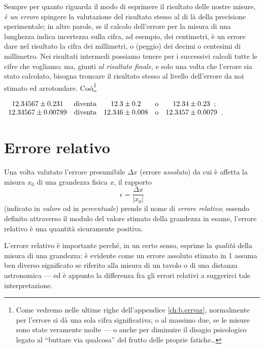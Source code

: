 Sempre per quanto riguarda il modo di esprimere il risultato
delle nostre misure, \emph{\`e un errore} spingere la
valutazione del risultato stesso al di l\`a della precisione
sperimentale; in altre parole, se il calcolo dell'errore per
la misura di una lunghezza indica incertezza sulla cifra, ad
esempio, dei centimetri, \`e un errore dare nel risultato la
cifra dei millimetri, o (peggio) dei decimi o centesimi di
millimetro.  Nei risultati intermedi possiamo tenere per i
successivi calcoli tutte le cifre che vogliamo; ma, giunti
\emph{al risultato finale}, e solo una volta che l'errore
sia stato calcolato, bisogna troncare il risultato stesso al
livello dell'errore da noi stimato ed arrotondare.
Cos\`\i\/\footnote{Come vedremo nelle ultime righe
  dell'appendice \ref{ch:b.errvar}, normalmente per l'errore
  si d\`a una sola cifra significativa; o al massimo due, se
  le misure sono state veramente molte --- o anche per
  diminuire il disagio psicologico legato al ``buttare via
  qualcosa'' del frutto delle proprie fatiche\ldots}
\begin{center}
  \begin{math}
    \begin{array}{ccccc}
      12.34567 \pm 0.231   & \makebox{diventa} & 12.3   \pm 0.2   &
      \makebox{o} & 12.34 \pm 0.23 \peq ; \\*
      12.34567 \pm 0.00789 & \makebox{diventa} & 12.346 \pm 0.008 &
      \makebox{o} & 12.3457 \pm 0.0079 \peq .
    \end{array}
  \end{math}
\end{center}%

\section{Errore relativo}%
\label{ch:2.errel}
Una volta valutato l'errore presumibile $\Delta x$ (errore
\emph{assoluto}) da cui \`e affetta la misura $x_0$ di una
grandezza fisica $x$, il rapporto
\begin{equation} \label{eq:2.errel}
 \epsilon = \frac{\Delta x}{\left| x_0 \right|}
\end{equation}
(indicato in \emph{valore} od in \emph{percentuale}) prende
il nome di \emph{errore relativo}; essendo definito
attraverso il modulo del valore stimato della grandezza in
esame, l'errore relativo \`e una quantit\`a sicuramente
positiva.

L'errore relativo \`e importante perch\'e, in un certo
senso, esprime la \emph{qualit\`a} della misura di una
grandezza: \`e evidente come un errore assoluto stimato in
1 assuma ben diverso significato se riferito alla
misura di un tavolo o di una distanza astronomica --- ed \`e
appunto la differenza fra gli errori relativi a suggerirci
tale interpretazione.

